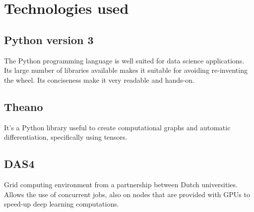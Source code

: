 \section{Technologies used}

\subsection{Python version 3}
The Python programming language is well suited for data science applications. Its large
number of libraries available makes it suitable for avoiding re-inventing the wheel.
Its conciseness make it very readable and hands-on.

\subsection{Theano}
It's a Python library useful to create computational graphs and automatic differentiation,
specifically using tensors.

\subsection{DAS4}
Grid computing environment from a partnership between Dutch universities. Allows the use
of concurrent jobs, also on nodes that are provided with GPUs to speed-up deep learning
computations.

